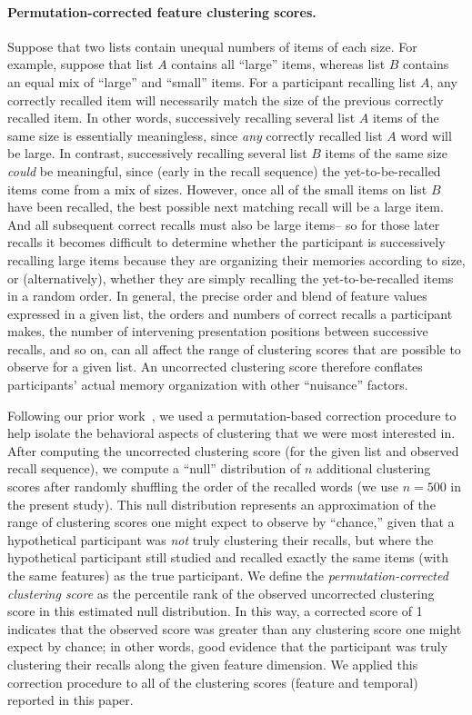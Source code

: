 \documentclass[11pt]{article}
\begin{document}
\paragraph*{Permutation-corrected feature clustering scores.}

Suppose that two lists contain unequal numbers of items of each size. For
example, suppose that list $A$ contains all ``large'' items, whereas list $B$
contains an equal mix of ``large'' and ``small'' items. For a participant
recalling list $A$, any correctly recalled item will necessarily match the size
of the previous correctly recalled item. In other words, successively recalling
several list $A$ items of the same size is essentially meaningless, since
\textit{any} correctly recalled list $A$ word will be large. In contrast,
successively recalling several list $B$ items of the same size \textit{could}
be meaningful, since (early in the recall sequence) the yet-to-be-recalled
items come from a mix of sizes. However, once all of the small items on list
$B$ have been recalled, the best possible next matching recall will be a large
item. And all subsequent correct recalls must also be large items-- so for
those later recalls it becomes difficult to determine whether the participant
is successively recalling large items because they are organizing their
memories according to size, or (alternatively), whether they are simply
recalling the yet-to-be-recalled items in a random order. In general, the
precise order and blend of feature values expressed in a given list, the orders
and numbers of correct recalls a participant makes, the number of intervening
presentation positions between successive recalls, and so on, can all affect
the range of clustering scores that are possible to observe for a given list.
An uncorrected clustering score therefore conflates participants' actual memory
organization with other ``nuisance'' factors.

Following our prior work~\citep{HeusEtal17}, we used a permutation-based
correction procedure to help isolate the behavioral aspects of clustering that
we were most interested in. After computing the uncorrected clustering score
(for the given list and observed recall sequence), we compute a ``null''
distribution of $n$ additional clustering scores after randomly shuffling the
order of the recalled words (we use $n = 500$ in the present study). This null
distribution represents an approximation of the range of clustering scores one
might expect to observe by ``chance,'' given that a hypothetical participant
was \textit{not} truly clustering their recalls, but where the hypothetical
participant still studied and recalled exactly the same items (with the same
features) as the true participant. We define the \textit{permutation-corrected
clustering score} as the percentile rank of the observed uncorrected clustering
score in this estimated null distribution. In this way, a corrected score of 1
indicates that the observed score was greater than any clustering score one
might expect by chance; in other words, good evidence that the participant was
truly clustering their recalls along the given feature dimension. We applied
this correction procedure to all of the clustering scores (feature and
temporal) reported in this paper.
\end{document}
